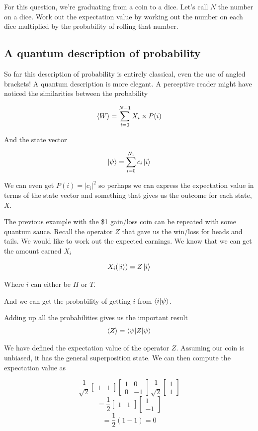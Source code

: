 \documentclass{book}
\begin{document}
For this question, we're graduating from a coin to a dice. Let's call $N$ the number on a dice. Work out the expectation value by working out the number on each dice multiplied by the probability of rolling that number. \newline

\hline

\subsection{ A quantum description of probability }

So far this description of probability is entirely classical, even the use of angled brackets! A quantum description is more elegant. A perceptive reader might have noticed the similarities between the probability

$$ \braket{W} = \sum_{i = 0}^{N-1} X_i \times P(i) $$

And the state vector

$$
\ket{\psi} = \sum_{i = 0}^{N_1} c_i \ket{i}
$$ 

We can even get $P(i) = |c_i|^2$ so perhaps we can express the expectation value in terms of the state vector and something that gives us the outcome for each state,$X$. 

The previous example with the \$1 gain/loss coin can be repeated with some quantum sauce. Recall the operator $Z$ that gave us the win/loss for heads and tails. We would like to work out the expected earnings. We know that we can get the amount earned $X_i$

$$ X_i (\ket{i}) = Z\ket{i}$$

Where $i$ can either be $H$ or $T$. 

And we can get the probability of getting $i$ from $\braket{i|\psi}$.

Adding up all the probabilities gives us the important result
$$
\braket{Z} = \braket{\psi|Z|\psi}
$$

We have defined the expectation value of the operator $Z$. Assuming our coin is unbiased, it has the general superposition state. We can then compute the expectation value as

$$
\frac{1}{\sqrt{2}} \begin{bmatrix} 1 & 1 \end{bmatrix} \begin{bmatrix} 1 & 0 \\ 0 & -1 \end{bmatrix} \frac{1}{\sqrt{2}} \begin{bmatrix} 1 \\ 1 \end{bmatrix}
$$
$$
= \frac{1}{2}\begin{bmatrix} 1 & 1 \end{bmatrix} \begin{bmatrix} 1 \\ -1 \end{bmatrix}
$$
$$ = \frac{1}{2} ( 1 - 1) = 0 $$ 
\end{document}
